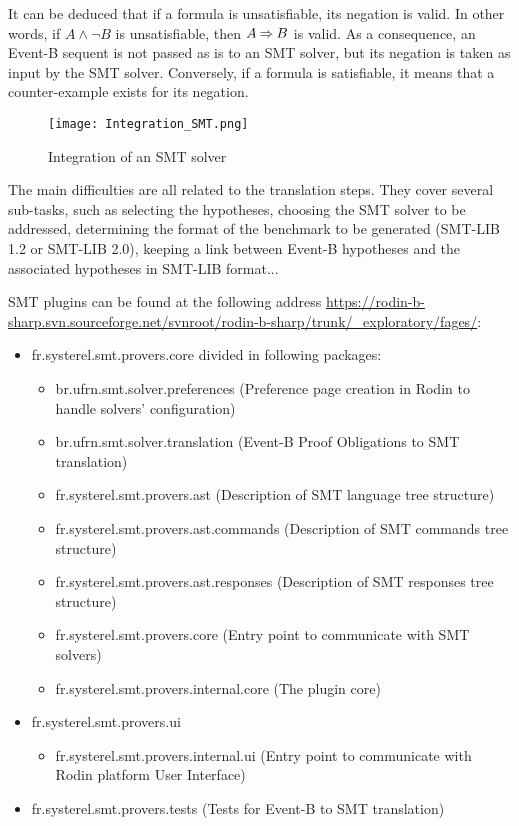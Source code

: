It can be deduced that if a formula is unsatisfiable, its negation is valid. In other words, if $A \land \lnot B$ is unsatisfiable, then $A \mathbin\Rightarrow B$ is valid. As a consequence, an Event-B sequent is not passed as is to an SMT solver, but its negation is taken as input by the SMT solver.
Conversely, if a formula is satisfiable, it means that a counter-example exists for its negation.

\begin{figure}
\centering
\texttt{[image: Integration\_SMT.png]}
\caption{Integration of an SMT solver} 
\label{Fig:SMT solver}
\end{figure}

The main difficulties are all related to the translation steps. They cover several sub-tasks, such as selecting the hypotheses, choosing the SMT solver to be addressed, determining the format of the benchmark to be generated (SMT-LIB 1.2 or SMT-LIB 2.0), keeping a link between Event-B hypotheses and the associated hypotheses in SMT-LIB format...\newline


SMT plugins can be found at the following address \url{https://rodin-b-sharp.svn.sourceforge.net/svnroot/rodin-b-sharp/trunk/_exploratory/fages/}:
\begin{itemize}
\item fr.systerel.smt.provers.core divided in following packages:
	\begin{itemize}
	\item br.ufrn.smt.solver.preferences (Preference page creation in Rodin to handle solvers' configuration)
	\item br.ufrn.smt.solver.translation (Event-B Proof Obligations to SMT translation)
	\item fr.systerel.smt.provers.ast (Description of SMT language tree structure)
	\item fr.systerel.smt.provers.ast.commands (Description of SMT commands tree structure)
	\item fr.systerel.smt.provers.ast.responses (Description of SMT responses tree structure)
	\item fr.systerel.smt.provers.core (Entry point to communicate with SMT solvers) 
	\item fr.systerel.smt.provers.internal.core (The plugin core)
	\end{itemize}
\item fr.systerel.smt.provers.ui 
	\begin{itemize}
	\item fr.systerel.smt.provers.internal.ui (Entry point to communicate with Rodin platform User Interface)
	\end{itemize}
\item fr.systerel.smt.provers.tests (Tests for Event-B to SMT translation)
\end{itemize}
